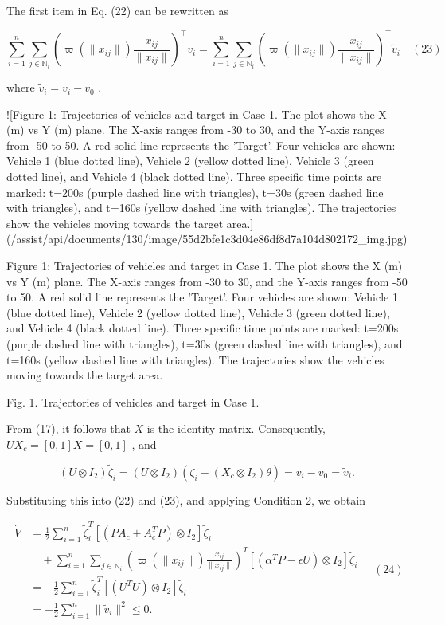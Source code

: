The first item in Eq. (22) can be rewritten as

$$\sum_{i=1}^n \sum_{j \in \mathbb{N}_i} (\varpi(\|x_{ij}\|) \frac{x_{ij}}{\|x_{ij}\|})^\top v_i = \sum_{i=1}^n \sum_{j \in \mathbb{N}_i} (\varpi(\|x_{ij}\|) \frac{x_{ij}}{\|x_{ij}\|})^\top \tilde{v}_i \quad (23)$$

where  $\tilde{v}_i = v_i - v_0$ .

![Figure 1: Trajectories of vehicles and target in Case 1. The plot shows the X (m) vs Y (m) plane. The X-axis ranges from -30 to 30, and the Y-axis ranges from -50 to 50. A red solid line represents the 'Target'. Four vehicles are shown: Vehicle 1 (blue dotted line), Vehicle 2 (yellow dotted line), Vehicle 3 (green dotted line), and Vehicle 4 (black dotted line). Three specific time points are marked: t=200s (purple dashed line with triangles), t=30s (green dashed line with triangles), and t=160s (yellow dashed line with triangles). The trajectories show the vehicles moving towards the target area.](/assist/api/documents/130/image/55d2bfe1c3d04e86df8d7a104d802172_img.jpg)

Figure 1: Trajectories of vehicles and target in Case 1. The plot shows the X (m) vs Y (m) plane. The X-axis ranges from -30 to 30, and the Y-axis ranges from -50 to 50. A red solid line represents the 'Target'. Four vehicles are shown: Vehicle 1 (blue dotted line), Vehicle 2 (yellow dotted line), Vehicle 3 (green dotted line), and Vehicle 4 (black dotted line). Three specific time points are marked: t=200s (purple dashed line with triangles), t=30s (green dashed line with triangles), and t=160s (yellow dashed line with triangles). The trajectories show the vehicles moving towards the target area.

Fig. 1. Trajectories of vehicles and target in Case 1.

From (17), it follows that  $X$  is the identity matrix. Consequently,  $UX_c = [0, 1]X = [0, 1]$ , and

$$(U \otimes I_2)\tilde{\zeta}_i = (U \otimes I_2)(\zeta_i - (X_c \otimes I_2)\theta) = v_i - v_0 = \tilde{v}_i.$$

Substituting this into (22) and (23), and applying Condition 2, we obtain

$$\begin{aligned} \dot{V} &= \frac{1}{2} \sum_{i=1}^n \tilde{\zeta}_i^T [(PA_c + A_c^T P) \otimes I_2] \tilde{\zeta}_i \\ &\quad + \sum_{i=1}^n \sum_{j \in \mathbb{N}_i} (\varpi(\|x_{ij}\|) \frac{x_{ij}}{\|x_{ij}\|})^T [(\alpha^T P - \epsilon U) \otimes I_2] \tilde{\zeta}_i \\ &= -\frac{1}{2} \sum_{i=1}^n \tilde{\zeta}_i^T [(U^T U) \otimes I_2] \tilde{\zeta}_i \\ &= -\frac{1}{2} \sum_{i=1}^n \|\tilde{v}_i\|^2 \leq 0. \end{aligned} \quad (24)$$

